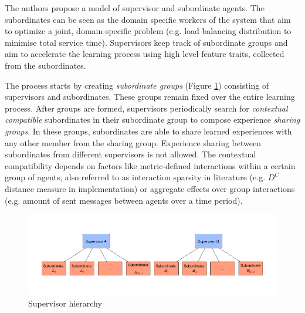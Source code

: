 \documentclass[letterpaper]{article}
\begin{document}
The authors propose a model of supervisor and subordinate agents. The subordinates can be seen as the domain specific workers of the system that aim to optimize a joint, domain-specific problem (e.g. load balancing distribution to minimise total service time). Supervisors keep track of subordinate groups and aim to accelerate the learning process using high level feature traits, collected from the subordinates.

The process starts by creating \textit{subordinate groups} (Figure \ref{fig:subordinate}) consisting of supervisors and subordinates. These groups remain fixed over the entire learning process. After groups are formed, supervisors periodically search for \textit{contextual compatible} subordinates in their subordinate group to compose experience \textit{sharing groups}. In these groups, subordinates are able to share learned experiences with any other member from the sharing group. Experience sharing between subordinates from different supervisors is not allowed. The contextual compatibility depends on factors like metric-defined interactions within a certain group of agents, also referred to as interaction sparsity in literature (e.g. $D^C$ distance measure in implementation) or aggregate effects over group interactions (e.g. amount of sent messages between agents over a time period).
\begin{figure}[h]
 \begin{center}
  \includegraphics[width=\linewidth]{figures/subordinates}
  \caption{Supervisor hierarchy \citep{garant2015accelerating}}
  \label{fig:subordinate}
 \end{center}
\end{figure}
\end{document}
